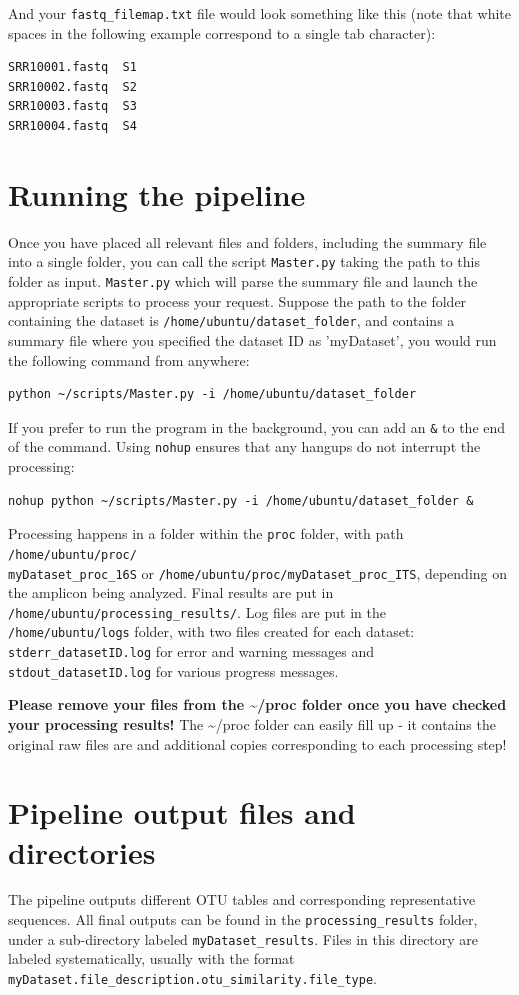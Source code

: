 \documentclass[11pt, oneside]{article}   	%
\begin{document}
And your {\tt fastq\_filemap.txt} file would look something like this (note that white spaces in the following example correspond to a single tab character):

\begin{verbatim}
SRR10001.fastq	S1
SRR10002.fastq	S2
SRR10003.fastq	S3
SRR10004.fastq	S4
\end{verbatim}

\section{Running the pipeline}
Once you have placed all relevant files and folders, including the summary file into a single folder, you can call the script {\tt Master.py} taking the path to this folder as input.  {\tt Master.py} which will parse the summary file and launch the appropriate scripts to process your request.  Suppose the path to the folder containing the dataset is {\tt /home/ubuntu/dataset\_folder}, and contains a summary file where you specified the dataset ID as 'myDataset', you would run the following command from anywhere:
\begin{verbatim}
python ~/scripts/Master.py -i /home/ubuntu/dataset_folder
\end{verbatim}
If you prefer to run the program in the background, you can add an {\tt \&} to the end of the command. Using {\tt nohup} ensures that any hangups do not interrupt the processing:
\begin{verbatim}
nohup python ~/scripts/Master.py -i /home/ubuntu/dataset_folder &
\end{verbatim}
Processing happens in a folder within the {\tt proc} folder, with path {\tt /home/ubuntu/proc/ \\ myDataset\_proc\_16S} or {\tt /home/ubuntu/proc/myDataset\_proc\_ITS}, depending on the amplicon being analyzed.  Final results are put in {\tt /home/ubuntu/processing\_results/}. Log files are put in the {\tt /home/ubuntu/logs} folder, with two files created for each dataset: {\tt stderr\_datasetID.log} for error and warning messages and {\tt stdout\_datasetID.log} for various progress messages.

\textbf{Please remove your files from the \~{}/proc folder once you have checked your processing results!} The \~{}/proc folder can easily fill up - it contains the original raw files are and additional copies corresponding to each processing step!

\section{Pipeline output files and directories}
The pipeline outputs different OTU tables and corresponding representative sequences. All final outputs can be found in the {\tt processing\_results} folder, under a sub-directory labeled {\tt myDataset\_results}. Files in this directory are labeled systematically, usually with the format {\tt myDataset.file\_description.otu\_similarity.file\_type}. 
\end{document}
